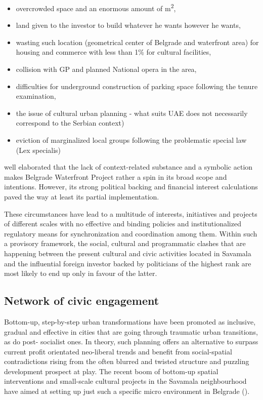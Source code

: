 \documentclass[11pt]{report}
\begin{document}
{{{{\begin{itemize}
\begin{itemize}
\item overcrowded space and an enormous amount of m\textsuperscript{2},
\item land given to the investor to build whatever he wants however he wants,
\item wasting such location (geometrical center of Belgrade and waterfront area) for housing and commerce with less than 1\% for cultural facilities,
\item collision with GP and planned National opera in the area,
\item difficulties for underground construction of parking space following the tenure examination,
\item the issue of cultural urban planning - what suits UAE does not necessarily correspond to the Serbian context)
\item eviction of marginalized local groups following the problematic special law (Lex specialis)
\end{itemize}

\href{Vukmirovic}{\cite{doytchinov_belgrade:_2015}}
well elaborated that the lack of context-related substance and a symbolic action makes Belgrade Waterfront Project rather a spin in its broad scope and intentions. However, its strong political backing and financial interest calculations paved the way at least its partial implementation.
\end{itemize}

These circumstances have lead to a multitude of interests, initiatives and projects of different scales with no effective and binding policies and institutionalized regulatory means for synchronization and coordination among them. Within such a provisory framework, the social, cultural and programmatic clashes that are happening between the present cultural and civic activities located in Savamala and the influential foreign investor backed by politicians of the highest rank are most likely to end up only in favour of the latter.

\subsection{Network of civic engagement}

Bottom-up, step-by-step urban transformations have been promoted as inclusive, gradual and effective in cities that are going through traumatic urban transitions, as do post- socialist ones. In theory, such planning offers an alternative to surpass current profit orientated
neo-liberal trends and benefit from social-spatial contradictions rising from the often blurred and twisted structure and puzzling development prospect at play. The recent boom of bottom-up spatial interventions and small-scale cultural projects in the Savamala neighbourhood have aimed at setting up just such a specific micro environment in Belgrade (\href{Urban Incubator}{\citealt{muller-wieferig_urban_2013}}).
\\

}}}}
\end{document}
